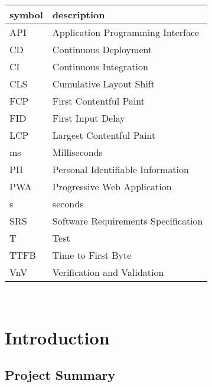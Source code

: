 \documentclass[12pt, titlepage]{article}
\begin{document}
\renewcommand{\arraystretch}{1.2}
\begin{tabular}{l l}
	\toprule
	\textbf{symbol} & \textbf{description}                \\
	\midrule
	API             & Application Programming Interface   \\
	CD              & Continuous Deployment               \\
	CI              & Continuous Integration              \\
	CLS             & Cumulative Layout Shift             \\
	FCP             & First Contentful Paint              \\
	FID             & First Input Delay                   \\
	LCP             & Largest Contentful Paint            \\
	ms              & Milliseconds                        \\
	PII             & Personal Identifiable Information   \\
	PWA             & Progressive Web Application         \\
	s               & seconds                             \\
	SRS             & Software Requirements Specification \\
	T               & Test                                \\
	TTFB            & Time to First Byte                  \\
	VnV             & Verification and Validation         \\
	\bottomrule
\end{tabular}\\

\newpage

\tableofcontents

\listoftables %

\listoffigures %

\newpage


\section{Introduction}

\subsection{Project Summary}
\end{document}
